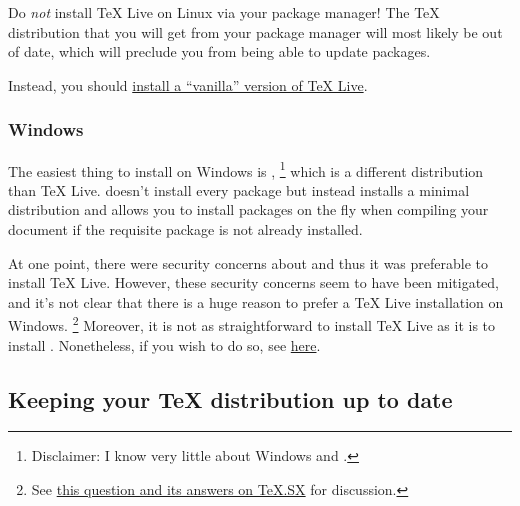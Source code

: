 Do \emph{not} install TeX Live on Linux via your package manager!
The \TeX{} distribution that you will get from your package manager will most likely be out of date, which will preclude you from being able to update packages.

Instead, you should \href{http://tex.stackexchange.com/q/1092/32888}{install a ``vanilla'' version of TeX Live}.

\subsubsection{Windows}
\label{subsubsec:tex-distro:windows}

The easiest thing to install on Windows is ,%
\footnote{%
Disclaimer: I know very little about Windows and .%
} %
which is a different distribution than TeX Live.
 doesn't install every package but instead installs a minimal distribution and allows you to install packages on the fly when compiling your document if the requisite package is not already installed.

At one point, there were security concerns about  and thus it was preferable to install TeX Live.
However, these security concerns seem to have been mitigated, and it's not clear that there is a huge reason to prefer a TeX Live installation on Windows.%
\footnote{%
See \href{http://tex.stackexchange.com/q/20036/32888}{this question and its answers on TeX.SX} for discussion.%
}
Moreover, it is not as straightforward to install TeX Live as it is to install .
Nonetheless, if you wish to do so, see \href{http://www.tug.org/texlive/acquire-netinstall.html}{here}.

\subsection{Keeping your \TeX{} distribution up to date}
\label{subsec:keeping-your-tex-distro-up-to-date}


